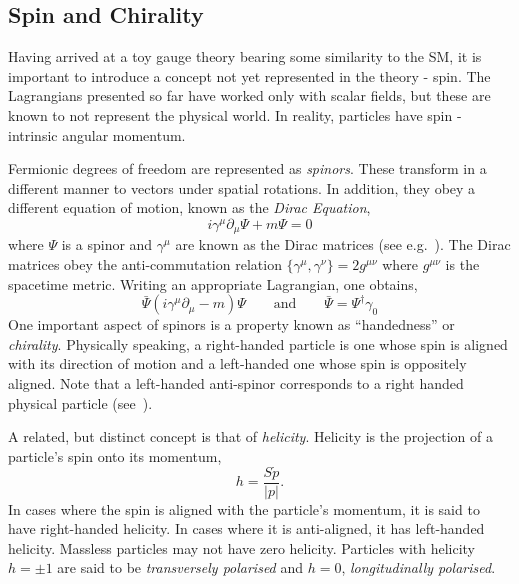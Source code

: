 \subsection{Spin and Chirality}
Having arrived at a toy gauge theory bearing some similarity to the \ac{SM}, it
is important to introduce a concept not yet represented in the theory -
spin. The Lagrangians presented so far have worked only with scalar fields, but
these are known to not represent the physical world. In reality, particles have
spin - intrinsic angular momentum.

Fermionic degrees of freedom are represented as \emph{spinors}. These transform
in a different manner to vectors under spatial rotations. In addition, they obey
a different equation of motion, known as the \emph{Dirac Equation},
\begin{equation}
i\gamma^\mu \partial_{\mu}\Psi + m\Psi = 0
\end{equation}
where $\Psi$ is a spinor and $\gamma^{\mu}$ are known as the Dirac matrices
(see e.g.~\cite{aitchison}). The Dirac matrices obey the anti-commutation
relation $\{\gamma^{\mu}, \gamma^{\nu}\} = 2g^{\mu\nu}$ where $g^{\mu\nu}$ is
the spacetime metric. Writing an appropriate Lagrangian, one obtains,
\begin{equation}
\bar{\Psi} \left (i\gamma^{\mu}\partial_{\mu} -m\right)\Psi \qquad \textrm{and} \qquad \bar{\Psi} =
\Psi^{\dagger}\gamma_0
\end{equation}
One important aspect of spinors is a property known as ``handedness'' or
\emph{chirality}. Physically speaking, a right-handed particle is one whose spin
is aligned with its direction of motion and a left-handed one whose spin is
oppositely aligned. Note that a left-handed anti-spinor corresponds to a right
handed physical particle (see~\cite{peskin_schroeder}).

A related, but distinct concept is that of \emph{helicity}. Helicity is the
projection of a particle's spin onto its momentum,
\begin{equation*}
h = \frac{S\dot p}{\left|p\right|}.
\end{equation*}
In cases where the spin is aligned with the particle's momentum, it is said to
have right-handed helicity. In cases where it is anti-aligned, it has
left-handed helicity. Massless particles may not have zero helicity. Particles
with helicity $h=\pm 1$ are said to be \emph{transversely polarised} and $h=0$,
\emph{longitudinally polarised}.

